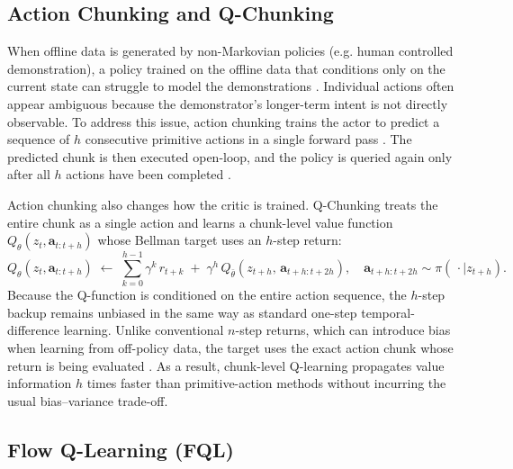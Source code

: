 \subsection{Action Chunking and Q-Chunking}
\label{sec:qchunking-bg}

When offline data is generated by non-Markovian policies (e.g. human controlled demonstration), a policy trained on the offline data that conditions only on the current state can struggle to model the demonstrations \cite{zhao2023learningfinegrainedbimanualmanipulation, chi2024diffusionpolicyvisuomotorpolicy}. Individual actions often appear ambiguous because the demonstrator's longer-term intent is not directly observable. To address this issue, action chunking trains the actor to predict a sequence of $h$ consecutive primitive actions in a single forward pass \cite{zhao2023learningfinegrainedbimanualmanipulation,li2026reinforcementlearningactionchunking}. The predicted chunk is then executed open-loop, and the policy is queried again only after all $h$ actions have been completed \cite{zhao2023learningfinegrainedbimanualmanipulation, chi2024diffusionpolicyvisuomotorpolicy}.

Action chunking also changes how the critic is trained. Q-Chunking \cite{li2026reinforcementlearningactionchunking} treats the entire chunk as a single action and learns a chunk-level value function $Q_\theta(z_t, \mathbf{a}_{t:t+h})$ whose Bellman target uses an $h$-step return:
\begin{equation}
    Q_\theta(z_t, \mathbf{a}_{t:t+h}) \;\leftarrow\; \sum_{k=0}^{h-1} \gamma^{k}\, r_{t+k} \;+\; \gamma^{h}\, Q_{\bar\theta}\!\left(z_{t+h},\, \mathbf{a}_{t+h:t+2h}\right),
    \quad \mathbf{a}_{t+h:t+2h} \sim \pi(\,\cdot\mid z_{t+h}).
    \label{eq:qchunking-target}
\end{equation}
Because the Q-function is conditioned on the entire action sequence, the $h$-step backup remains unbiased in the same way as standard one-step temporal-difference learning. Unlike conventional $n$-step returns, which can introduce bias when learning from off-policy data, the target uses the exact action chunk whose return is being evaluated \cite{munos2016safeefficientoffpolicyreinforcement, sutton2018reinforcement}. As a result, chunk-level Q-learning propagates value information $h$ times faster than primitive-action methods without incurring the usual bias–variance trade-off.

\subsection{Flow Q-Learning (FQL)}
\label{sec:fql-bg}

